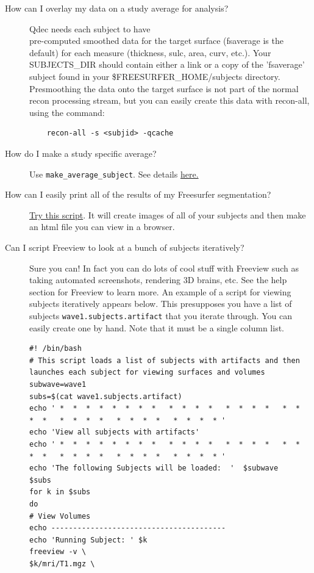 \documentclass[paper=a4, fontsize=11pt]{scrartcl} %
\numberwithin{equation}{section} %
\numberwithin{figure}{section} %
\numberwithin{table}{section} %
\begin{document}
\begin{appendices}
\begin{description}
\item[How can I overlay my data on a study average for analysis?] Qdec needs each subject to have \\ pre-computed smoothed data for the target surface (fsaverage is the default) for each measure (thickness, sulc, area, curv, etc.). Your SUBJECTS\_DIR should contain either a link or a copy of the 'fsaverage' subject found in your \$FREESURFER\_HOME/subjects directory. Presmoothing the data onto the target surface is not part of the normal recon processing stream, but you can easily create this data with recon-all, using the command: 
	\begin{lstlisting}
	recon-all -s <subjid> -qcache
	\end{lstlisting}
\item[How do I make a study specific average?]  Use \texttt{make\_average\_subject}.  See details  \href{http://surfer.nmr.mgh.harvard.edu/fswiki/make_average_subject}{here.}
\item[How can I easily print all of the results of my Freesurfer segmentation?]  \href{https://www.dropbox.com/s/q0j2i71np6mt39r/fsqc.sh?dl=0}{Try this script}.  It will create images of all of your subjects and then make an html file you can view in a browser.
\newpage
\item[Can I script Freeview to look at a bunch of subjects iteratively?]  Sure you can!  In fact you can do lots of cool stuff with Freeview such as taking automated screenshots, rendering 3D brains, etc.  See the help section for Freeview to learn more.  An example of a script for viewing subjects iteratively appears below.  This presupposes you have a list of subjects \texttt{wave1.subjects.artifact} that you iterate through.  You can easily create one by hand.  Note that it must be a single column list.
\begin{lstlisting}
#! /bin/bash
# This script loads a list of subjects with artifacts and then launches each subject for viewing surfaces and volumes
subwave=wave1
subs=$(cat wave1.subjects.artifact)
echo ' *  *  *  *  *  *  *  *   *  *  *  *   *  *  *  *   *  *  *  *   *  *  *  *   *  *  *  *   *  *  *  * '
echo 'View all subjects with artifacts'
echo ' *  *  *  *  *  *  *  *   *  *  *  *   *  *  *  *   *  *  *  *   *  *  *  *   *  *  *  *   *  *  *  * '
echo 'The following Subjects will be loaded:  '  $subwave
$subs
for k in $subs
do
# View Volumes
echo ----------------------------------------
echo 'Running Subject: ' $k
freeview -v \
$k/mri/T1.mgz \

\end{lstlisting}
\end{description}
\end{appendices}
\end{document}
